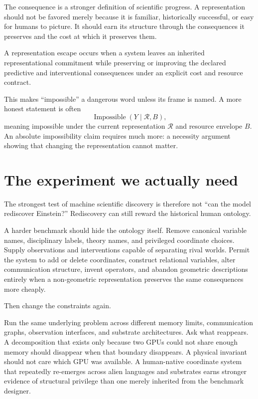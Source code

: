 \documentclass[11pt]{article}
\newcommand{\Rcal}{\mathcal R}
\begin{document}
The consequence is a stronger definition of scientific progress. A representation should not be favored merely because it is familiar, historically successful, or easy for humans to picture. It should earn its structure through the consequences it preserves and the cost at which it preserves them.

\begin{keybox}
A representation escape occurs when a system leaves an inherited representational commitment while preserving or improving the declared predictive and interventional consequences under an explicit cost and resource contract.
\end{keybox}

This makes ``impossible'' a dangerous word unless its frame is named. A more honest statement is often
\[
\operatorname{Impossible}(Y\mid \Rcal,B),
\]
meaning impossible under the current representation $\Rcal$ and resource envelope $B$. An absolute impossibility claim requires much more: a necessity argument showing that changing the representation cannot matter.

\section{The experiment we actually need}
The strongest test of machine scientific discovery is therefore not ``can the model rediscover Einstein?'' Rediscovery can still reward the historical human ontology.

A harder benchmark should hide the ontology itself. Remove canonical variable names, disciplinary labels, theory names, and privileged coordinate choices. Supply observations and interventions capable of separating rival worlds. Permit the system to add or delete coordinates, construct relational variables, alter communication structure, invent operators, and abandon geometric descriptions entirely when a non-geometric representation preserves the same consequences more cheaply.

Then change the constraints again.

Run the same underlying problem across different memory limits, communication graphs, observation interfaces, and substrate architectures. Ask what reappears. A decomposition that exists only because two GPUs could not share enough memory should disappear when that boundary disappears. A physical invariant should not care which GPU was available. A human-native coordinate system that repeatedly re-emerges across alien languages and substrates earns stronger evidence of structural privilege than one merely inherited from the benchmark designer.
\end{document}
